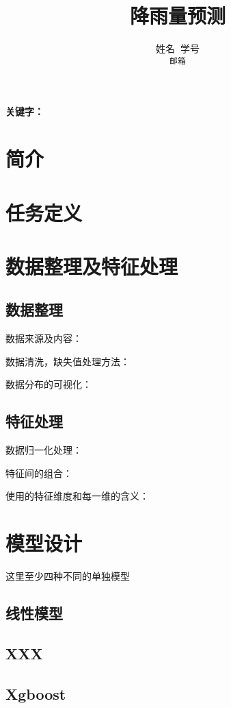 \documentclass[UTF8]{ctexart}
\title{降雨量预测} %
\author{姓名$\;\;$学号\\ \texttt{邮箱}} %
\date{} %
\begin{document}
\normalsize

\maketitle %
\setlength{\baselineskip}{18pt}
\begin{abstract}
\end{abstract}
\textbf{关键字：}
\section{简介}
\section{任务定义}
\section{数据整理及特征处理}
\subsection{数据整理}
数据来源及内容：

数据清洗，缺失值处理方法：

数据分布的可视化：

\subsection{特征处理}
数据归一化处理：

特征间的组合：

使用的特征维度和每一维的含义：

\section{模型设计}
这里至少四种不同的单独模型
\subsection{线性模型}

\subsection{XXX}

\subsection{Xgboost}
\end{document}
